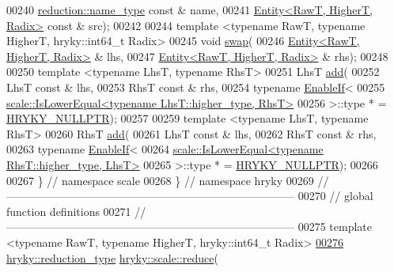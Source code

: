 \begin{DoxyCode}
00240         \hyperlink{classhryky_1_1reduction_1_1_string}{reduction::name_type} \textcolor{keyword}{const} & name,
00241         \hyperlink{classhryky_1_1scale_1_1_entity}{Entity<RawT, HigherT, Radix>} \textcolor{keyword}{const} & src);
00242 
00244     \textcolor{keyword}{template} <\textcolor{keyword}{typename} RawT, \textcolor{keyword}{typename} HigherT, hryky::\textcolor{keywordtype}{int}64\_t Radix>
00245     \textcolor{keywordtype}{void} \hyperlink{namespacehryky_1_1scale_ae4a4f26481f5a12c26e0d3c93f1d1bbc}{swap}(
00246         \hyperlink{classhryky_1_1scale_1_1_entity}{Entity<RawT, HigherT, Radix>} & lhs,
00247         \hyperlink{classhryky_1_1scale_1_1_entity}{Entity<RawT, HigherT, Radix>} & rhs);
00248 
00250     \textcolor{keyword}{template} <\textcolor{keyword}{typename} LhsT, \textcolor{keyword}{typename} RhsT>
00251     LhsT \hyperlink{namespacehryky_1_1scale_ac2fe4df99c737fa954907b456a705f75}{add}(
00252         LhsT \textcolor{keyword}{const} & lhs,
00253         RhsT \textcolor{keyword}{const} & rhs,
00254         \textcolor{keyword}{typename} \hyperlink{classhryky_1_1_enable_if}{EnableIf}<
00255             \hyperlink{classhryky_1_1scale_1_1_is_lower_equal}{scale::IsLowerEqual<typename LhsT::higher_type, RhsT>}
00256         >::type * = \hyperlink{common_8h_a4cd4ac09cfcdbd6b30ee69afc156e210}{HRYKY_NULLPTR});
00257 
00259     \textcolor{keyword}{template} <\textcolor{keyword}{typename} LhsT, \textcolor{keyword}{typename} RhsT>
00260     RhsT \hyperlink{namespacehryky_1_1scale_ac2fe4df99c737fa954907b456a705f75}{add}(
00261         LhsT \textcolor{keyword}{const} & lhs,
00262         RhsT \textcolor{keyword}{const} & rhs,
00263         \textcolor{keyword}{typename} \hyperlink{classhryky_1_1_enable_if}{EnableIf}<
00264             \hyperlink{classhryky_1_1scale_1_1_is_lower_equal}{scale::IsLowerEqual<typename RhsT::higher_type, LhsT>}
00265         >::type * = \hyperlink{common_8h_a4cd4ac09cfcdbd6b30ee69afc156e210}{HRYKY_NULLPTR});
00266 
00267 \} \textcolor{comment}{// namespace scale}
00268 \} \textcolor{comment}{// namespace hryky}
00269 \textcolor{comment}{//
      ------------------------------------------------------------------------------}
00270 \textcolor{comment}{// global function definitions}
00271 \textcolor{comment}{//
      ------------------------------------------------------------------------------}
00275 \textcolor{comment}{}\textcolor{keyword}{template} <\textcolor{keyword}{typename} RawT, \textcolor{keyword}{typename} HigherT, hryky::\textcolor{keywordtype}{int}64\_t Radix>
\hypertarget{scale__entity_8h_source_l00276}{}\hyperlink{namespacehryky_1_1scale_a6bbb1a80e433741768d3590c888ff644}{00276} \hyperlink{classhryky_1_1_intrusive_ptr}{hryky::reduction_type} \hyperlink{namespacehryky_1_1scale_a6bbb1a80e433741768d3590c888ff644}{hryky::scale::reduce}(

\end{DoxyCode}

